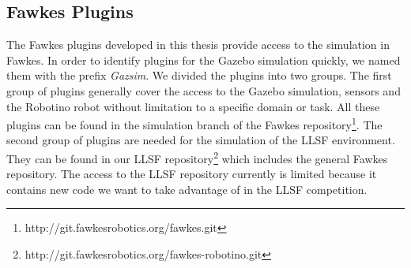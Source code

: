 \subsection{Fawkes Plugins}
The Fawkes plugins developed in this thesis provide access to the simulation in Fawkes. In order to identify plugins for the Gazebo simulation quickly, we named them with the prefix \textit{Gazsim}. We divided the plugins into two groups. The first group of plugins generally cover the access to the Gazebo simulation, sensors and the Robotino robot without limitation to a specific domain or task. All these plugins can be found in the simulation branch of the Fawkes repository\footnote{http://git.fawkesrobotics.org/fawkes.git}. The second group of plugins are needed for the simulation of the LLSF environment. They can be found in our LLSF repository\footnote{http://git.fawkesrobotics.org/fawkes-robotino.git} which includes the general Fawkes repository. The access to the LLSF repository currently is limited because it contains new code we want to take advantage of in the LLSF competition.

